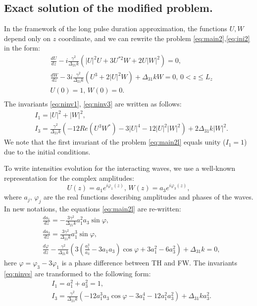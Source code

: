 \documentclass[a4paper, 12pt, onecolumn]{extarticle}
\begin{document}
\subsection{Exact solution of the modified problem.}
In the framework of the long pulse duration approximation, the functions \(U,W\) depend only on \(z\) coordinate, and we can rewrite the problem \eqref{eq:main2},\eqref{eq:ini2} in the form:
\begin{equation}
\label{eq:main2l}
\begin{aligned}
&\frac{dU}{dz}-i\frac{\gamma^2}{\Delta_{21} k}(|U|^2U+3U^{*2}W+2U|W|^2)=0,\\
&\frac{dW}{dz}-3i\frac{\gamma^2}{\Delta_{21} k}(U^3+2|U|^2W)+\Delta_{31}kW=0,\,  0< z \leq L_z\\
&U(0)=1,\,W(0)=0.\\
\end{aligned}
\end{equation}
The invariants \eqref{eq:ninv1}, \eqref{eq:ninv3} are written as follows:
\begin{equation}
\label{eq:ninvs}
\begin{aligned}
&I_1=|U|^2+|W|^2,\\
&I_3=\frac{\gamma^2}{\Delta_{21}k}\left(-12Re(U^3W^*)-3|U|^4-12|U|^2|W|^2\right)+2\Delta_{31}k|W|^2.
\end{aligned}
\end{equation}
We note that the first invariant of the problem \eqref{eq:main2l} equals unity (\(I_1=1\)) due to the initial conditions.

To write intensities evolution for the interacting waves, we use a well-known representation for the complex amplitudes:
\begin{equation}
\label{eq:repr}
U(z)=a_1e^{i\varphi_1(z)},\,W(z)=a_3e^{i\varphi_3(z)},
\end{equation}
where \(a_j,\,\varphi_j\) are the real functions describing amplitudes and phases of the waves. In new notations, the equations \eqref{eq:main2l} are re-written:
\begin{equation}
\label{eq:main3}
\begin{aligned}
&\frac{da_1}{dz}=-\frac{3\gamma^2}{\Delta_{21}k}a_1^2a_3\sin\varphi,\\
&\frac{da_3}{dz}=\frac{3\gamma^2}{\Delta_{21}k}a_1^3\sin\varphi,\\
&\frac{d\varphi}{dz}-\frac{\gamma^2}{\Delta_{21}k}\left(3\left(\frac{a_1^3}{a_3}-3a_1a_3\right)\cos\varphi+3a_1^2-6a_3^2\right)+\Delta_{31}k=0,
\end{aligned}
\end{equation}
here \(\varphi=\varphi_3-3\varphi_1\) is a phase difference between TH and FW. The invariants  \eqref{eq:ninvs} are transformed to the following form:
\[
\begin{aligned}
&I_1=a_1^2+a_3^2=1,\\
&I_3=\frac{\gamma^2}{\Delta_{21}k}\left(-12a_1^3a_3\cos\varphi-3a_1^4-12a_1^2a_3^2\right)+\Delta_{31}ka_3^2.
\end{aligned}
\] 
\end{document}

